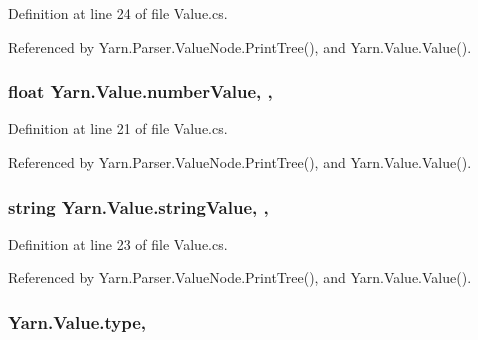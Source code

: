 Definition at line 24 of file Value.\-cs.



Referenced by Yarn.\-Parser.\-Value\-Node.\-Print\-Tree(), and Yarn.\-Value.\-Value().

\hypertarget{a00177_ae1892c1c7a8177537d1caa39a2e51da6}{
\subsubsection[{number\-Value}]{\setlength{\rightskip}{0pt plus 5cm}float Yarn.\-Value.\-number\-Value\hspace{0.3cm}{\ttfamily [get]}, {\ttfamily [set]}, {\ttfamily [package]}}}\label{a00177_ae1892c1c7a8177537d1caa39a2e51da6}


Definition at line 21 of file Value.\-cs.



Referenced by Yarn.\-Parser.\-Value\-Node.\-Print\-Tree(), and Yarn.\-Value.\-Value().

\hypertarget{a00177_add1b07146f1a9e4b655b33c93d07dff9}{
\subsubsection[{string\-Value}]{\setlength{\rightskip}{0pt plus 5cm}string Yarn.\-Value.\-string\-Value\hspace{0.3cm}{\ttfamily [get]}, {\ttfamily [set]}, {\ttfamily [package]}}}\label{a00177_add1b07146f1a9e4b655b33c93d07dff9}


Definition at line 23 of file Value.\-cs.



Referenced by Yarn.\-Parser.\-Value\-Node.\-Print\-Tree(), and Yarn.\-Value.\-Value().

\hypertarget{a00177_a6d5820fafa766911b9da84d1ed33e51a}{
\subsubsection[{type}]{ Yarn.\-Value.\-type\hspace{0.3cm}{\ttfamily [get]}, {\ttfamily [set]}}}\label{a00177_a6d5820fafa766911b9da84d1ed33e51a}


